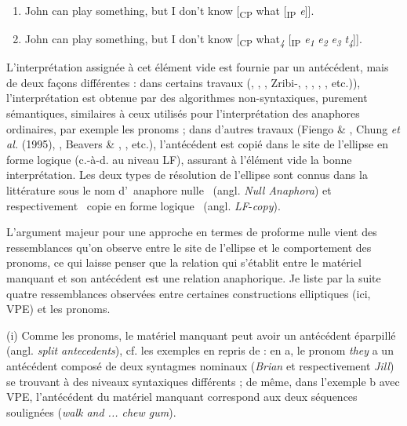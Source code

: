 \begin{enumerate}
\item \label{bkm:Ref305950047}John can play something, but I don't know [\textsubscript{CP} what [\textsubscript{IP} \textit{e}]].  

\item \label{bkm:Ref305950109}John can play something, but I don't know [\textsubscript{CP} what\textit{\textsubscript{4}} [\textsubscript{IP} \textit{e}\textit{\textsubscript{1} }\textit{e}\textit{\textsubscript{2} }\textit{e}\textit{\textsubscript{3} }\textit{t}\textit{\textsubscript{4}}]].  


\end{enumerate}
L'interprétation assignée à cet élément vide est fournie par un antécédent, mais de deux façons différentes : dans certains travaux (\citet{Wasow1972}, \citet{Shopen1972}, \citet{Williams1977}, Zribi-\citet{Hertz1986}, \citet{Hardt1993}, \citet{Lobeck1995}, \citet{Depiante2000}, \citet{Ludlow2005}, etc.)), l'interprétation est obtenue par des algorithmes non-syntaxiques, purement sémantiques, similaires à ceux utilisés pour l'interprétation des anaphores ordinaires, par exemple les pronoms ; dans d'autres travaux (Fiengo \& \citet{May1994}, Chung \textit{et al.} (1995), \citet{Lappin1999}, Beavers \& \citet{Sag2004}, \citet{Fortin2007}, etc.), l'antécédent est copié dans le site de l'ellipse en forme logique (c.-à-d. au niveau LF), assurant à l'élément vide la bonne interprétation. Les deux types de résolution de l'ellipse sont connus dans la littérature sous le nom d'{\guillemotleft}~anaphore nulle~{\guillemotright} (angl. \textit{Null Anaphora}) et respectivement {\guillemotleft}~copie en forme logique~{\guillemotright} (angl. \textit{LF}-\textit{copy}).

L'argument majeur pour une approche en termes de proforme nulle vient des ressemblances qu'on observe entre le site de l'ellipse et le comportement des pronoms, ce qui laisse penser que la relation qui s'établit entre le matériel manquant et son antécédent est une relation anaphorique. Je liste par la suite quatre ressemblances observées entre certaines constructions elliptiques (ici, VPE) et les pronoms.  

(i) Comme les pronoms, le matériel manquant peut avoir un antécédent éparpillé (angl. \textit{split antecedents}), cf. les exemples en  repris de \citet{Hardt1993} : en a, le pronom \textit{they} a un antécédent composé de deux syntagmes nominaux (\textit{Brian} et respectivement \textit{Jill}) se trouvant à des niveaux syntaxiques différents ; de même, dans l'exemple b avec VPE, l'antécédent du matériel manquant correspond aux deux séquences soulignées (\textit{walk and ... chew gum}).


